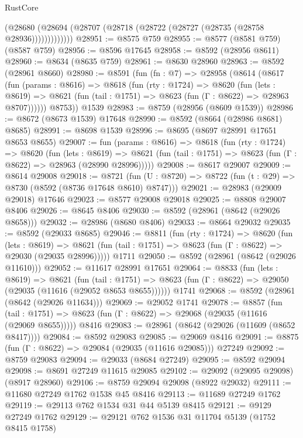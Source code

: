 \begin{lexlean}{RustCore}
\begin{coremodule}
              (@28680 (@28694 (@28707 (@28718 (@28722 (@28727 (@28735 (@28758 @28936)))))))))))))
@28951 := @8575 @759
@28955 := @8577 (@8581 @759) (@8587 @759)
@28956 := @8596 @17645
@28958 := @8592 (@28956 @8611)
@28960 := @8634 (@8635 @759)
@28961 := @8630 @28960
@28963 := @8592 (@28961 @8660)
@28980 := @8591
    (fun (fn : @7) =>
    @28958
      (@8614
        (@8617
          (fun (params : @8616) =>
          @8618
            (fun (rty : @1724) =>
            @8620
              (fun (lets : @8619) =>
              @8621 (fun (tail : @1751) => @8623 (fun (Γ : @8622) => @28963 @8707))))))
        @8753))
    @1539
@28983 := @8759 (@28956 (@8609 @1539))
@28986 := @8672 (@8673 @1539) @17648
@28990 := @8592 (@8664 (@28986 @8681) @8685)
@28991 := @8698 @1539
@28996 := @8695 (@8697 @28991 @17651 @8653 @8655)
@29007 := fun (params : @8616) =>
  @8618
    (fun (rty : @1724) =>
    @8620
      (fun (lets : @8619) =>
      @8621 (fun (tail : @1751) => @8623 (fun (Γ : @8622) => @28963 (@28990 @28996)))))
@29008 := @8617 @29007
@29009 := @8614 @29008
@29018 := @8721
    (fun (U : @8720) => @8722 (fun (t : @29) => @8730 (@8592 (@8736 @17648 @8610) @8747)))
@29021 := @28983 (@29009 @29018) @17646
@29023 := @8577 @29008 @29018
@29025 := @8808 @29007 @8406
@29026 := @8645 @8406
@29030 := @8592 (@28961 (@8642 (@29026 @8658)))
@29032 := @28986 (@8680 @8406)
@29033 := @8664 @29032
@29035 := @8592 (@29033 @8685)
@29046 := @8811
    (fun (rty : @1724) =>
    @8620
      (fun (lets : @8619) =>
      @8621 (fun (tail : @1751) => @8623 (fun (Γ : @8622) => @29030 (@29035 @28996)))))
    @1711
@29050 := @8592 (@28961 (@8642 (@29026 @11610)))
@29052 := @11617 @28991 @17651
@29064 := @8833
    (fun (lets : @8619) =>
    @8621
      (fun (tail : @1751) =>
      @8623 (fun (Γ : @8622) => @29050 (@29035 (@11616 (@29052 @8653 @8655))))))
    @1741
@29068 := @8592 (@28961 (@8642 (@29026 @11634)))
@29069 := @29052 @1741
@29078 := @8857
    (fun (tail : @1751) => @8623 (fun (Γ : @8622) => @29068 (@29035 (@11616 (@29069 @8655)))))
    @8416
@29083 := @28961 (@8642 (@29026 (@11609 (@8652 @8417))))
@29084 := @8592 @29083
@29085 := @29069 @8416
@29091 := @8875 (fun (Γ : @8622) => @29084 (@29035 (@11616 @29085))) @27249
@29092 := @8759 @29083
@29094 := @29033 (@8684 @27249)
@29095 := @8592 @29094
@29098 := @8691 @27249 @11615 @29085
@29102 := @29092 (@29095 @29098) (@8917 @28960)
@29106 := @8759 @29094 @29098 (@8922 @29032)
@29111 := @11680 @27249 @1762 @1538 @45 @8416
@29113 := @11689 @27249 @1762
@29119 := @29113 @762 @1534 @31 @44 @5139 @8415
@29121 := @9129 @27249 @1762
@29129 := @29121 @762 @1536 @31 @11704 @5139 (@1752 @8415 @1758)

\end{coremodule}
\end{lexlean}
